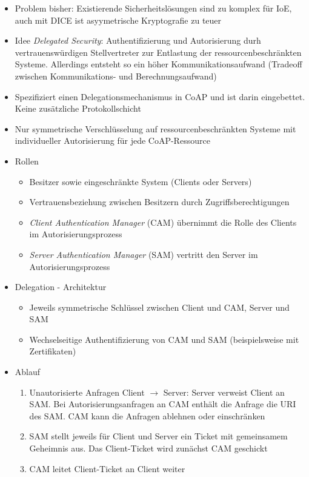 \begin{itemize}
\begin{itemize}
		\item Problem bisher: Existierende Sicherheitslösungen sind zu komplex für IoE, auch mit DICE ist asyymetrische Kryptografie zu teuer
		\item Idee \textit{Delegated Security}: Authentifizierung und Autorisierung durh vertrauenswürdigen Stellvertreter zur Entlastung der ressourcenbeschränkten Systeme. Allerdings entsteht so ein höher Kommunikationsaufwand (Tradeoff zwischen Kommunikations- und Berechnungsaufwand)
		\item Spezifiziert einen Delegationsmechanismus in CoAP und ist darin eingebettet. Keine zusätzliche Protokollschicht
		\item Nur symmetrische Verschlüsselung auf ressourcenbeschränkten Systeme mit individueller Autorisierung für jede CoAP-Ressource
		\item Rollen
		\begin{itemize}
			\item Besitzer sowie eingeschränkte System (Clients oder Servers)
			\item Vertrauensbeziehung zwischen Besitzern durch Zugriffsberechtigungen
			\item \textit{Client Authentication Manager} (CAM) übernimmt die Rolle des Clients im Autorisierungsprozess
			\item \textit{Server Authentication Manager} (SAM) vertritt den Server im Autorisierungsprozess
		\end{itemize}
		\item Delegation - Architektur
		\begin{itemize}
			\item Jeweils symmetrische Schlüssel zwischen Client und CAM, Server und SAM
			\item Wechselseitige Authentifizierung von CAM und SAM (beispielsweise mit Zertifikaten)
		\end{itemize}
		\item Ablauf
		\begin{enumerate}
			\item Unautorisierte Anfragen Client \(\rightarrow\) Server: Server verweist Client an SAM. Bei Autorisierungsanfragen an CAM enthält die Anfrage die URI des SAM. CAM kann die Anfragen ablehnen oder einschränken
			\item SAM stellt jeweils für Client und Server ein Ticket mit gemeinsamem Geheimnis aus. Das Client-Ticket wird zunächst CAM geschickt
			\item CAM leitet Client-Ticket an Client weiter
		\end{enumerate}
	\end{itemize}
\end{itemize}


